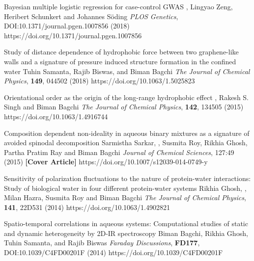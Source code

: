 


\begin{cvpubs}

%
        {Bayesian multiple logistic regression for case-control GWAS}
        {\selfauthor{}, Lingyao Zeng, Heribert Schunkert and Johannes S\"oding}
        {{\slshape PLOS Genetics}, DOI:10.1371/journal.pgen.1007856 (2018)}
        {https://doi.org/10.1371/journal.pgen.1007856}

%
        {Study of distance dependence of hydrophobic force between two graphene-like walls and a signature of pressure induced structure formation in the confined water}
        {Tuhin Samanta, Rajib Biswas, \selfauthor{} and Biman Bagchi}
        {{\slshape The Journal of Chemical Physics}, {\bfseries 149}, 044502 (2018)}
        {https://doi.org/10.1063/1.5025823}

%
        {Orientational order as the origin of the long-range hydrophobic effect}
        {\selfauthor{}, Rakesh S. Singh and Biman Bagchi}
        {{\slshape The Journal of Chemical Physics}, {\bfseries 142}, 134505 (2015)}
        {https://doi.org/10.1063/1.4916744}

%
        {Composition dependent non-ideality in aqueous binary mixtures
        as a signature of avoided spinodal decomposition}
        {Sarmistha Sarkar, \selfauthor{}, Susmita Roy, Rikhia Ghosh, Partha Pratim Ray and Biman Bagchi}
        {{\slshape Journal of Chemical Sciences}, 127:49 (2015) {\bfseries [Cover Article]}}
        {https://doi.org/10.1007/s12039-014-0749-y}

%
        {Sensitivity of polarization fluctuations to the nature of protein-water interactions:
        Study of biological water in four different protein-water systems}
        {Rikhia Ghosh, \selfauthor{}, Milan Hazra, Susmita Roy and Biman Bagchi}
        {{\slshape The Journal of Chemical Physics}, {\bfseries 141}, 22D531 (2014)}
        {https://doi.org/10.1063/1.4902821}

%
        {Spatio-temporal correlations in aqueous systems:
         Computational studies of static and dynamic heterogeneity by 2D-IR spectroscopy}
        {Biman Bagchi, Rikhia Ghosh, Tuhin Samanta, \selfauthor{} and Rajib Biswas}
        {{\slshape Faraday Discussions}, {\bfseries FD177}, DOI:10.1039/C4FD00201F (2014)}
        {https://doi.org/10.1039/C4FD00201F}


\end{cvpubs}

